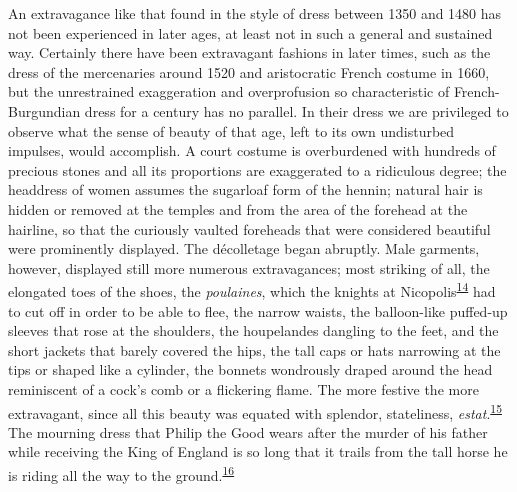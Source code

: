 An extravagance like that found in the style of dress between 1350 and
1480 has not been experienced in later ages, at least not
\protect\hypertarget{20_ILLUSTRATIONS_FOLLOW_PAGE.xhtmlux5cux23page_302}{}{}in
such a general and sustained way. Certainly there have been extravagant
fashions in later times, such as the dress of the mercenaries around
1520 and aristocratic French costume in 1660, but the unrestrained
exaggeration and overprofusion so characteristic of French-Burgundian
dress for a century has no parallel. In their dress we are privileged to
observe what the sense of beauty of that age, left to its own
undisturbed impulses, would accomplish. A court costume is overburdened
with hundreds of precious stones and all its proportions are exaggerated
to a ridiculous degree; the headdress of women assumes the sugarloaf
form of the hennin; natural hair is hidden or removed at the temples and
from the area of the forehead at the hairline, so that the curiously
vaulted foreheads that were considered beautiful were prominently
displayed. The décolletage began abruptly. Male garments, however,
displayed still more numerous extravagances; most striking of all, the
elongated toes of the shoes, the \emph{poulaines}, which the knights at
Nicopolis\textsuperscript{\protect\hypertarget{20_ILLUSTRATIONS_FOLLOW_PAGE.xhtmlux5cux23id_445}{\protect\hyperlink{23_NOTES.xhtmlux5cux23id_446}{14}}}
had to cut off in order to be able to flee, the narrow waists, the
balloon-like puffed-up sleeves that rose at the shoulders, the
houpelandes dangling to the feet, and the short jackets that barely
covered the hips, the tall caps or hats narrowing at the tips or shaped
like a cylinder, the bonnets wondrously draped around the head
reminiscent of a cock's comb or a flickering flame. The more festive the
more extravagant, since all this beauty was equated with splendor,
stateliness,
\emph{estat}.\textsuperscript{\protect\hypertarget{20_ILLUSTRATIONS_FOLLOW_PAGE.xhtmlux5cux23id_443}{\protect\hyperlink{23_NOTES.xhtmlux5cux23id_444}{15}}}
The mourning dress that Philip the Good wears after the murder of his
father while receiving the King of England is so long that it trails
from the tall horse he is riding all the way to the
ground.\textsuperscript{\protect\hypertarget{20_ILLUSTRATIONS_FOLLOW_PAGE.xhtmlux5cux23id_441}{\protect\hyperlink{23_NOTES.xhtmlux5cux23id_442}{16}}}


